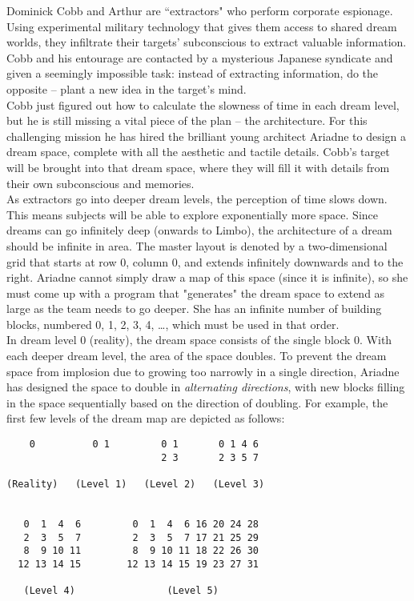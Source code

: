 
\noindent Dominick Cobb and Arthur are ``extractors" who perform corporate espionage. Using experimental military technology that gives them access to shared dream worlds, they infiltrate their targets' subconscious to extract valuable information. Cobb and his entourage are contacted by a mysterious Japanese syndicate and given a seemingly impossible task: instead of extracting information, do the opposite -- plant a new idea in the target's mind.\\

Cobb just figured out how to calculate the slowness of time in each dream level, but he is still missing a vital piece of the plan -- the architecture. For this challenging mission he has hired the brilliant young architect Ariadne to design a dream space, complete with all the aesthetic and tactile details. Cobb's target will be brought into that dream space, where they will fill it with details from their own subconscious and memories.\\

As extractors go into deeper dream levels, the perception of time slows down. This means subjects will be able to explore exponentially more space. Since dreams can go infinitely deep (onwards to Limbo), the architecture of a dream should be infinite in area. The master layout is denoted by a two-dimensional grid that starts at row 0, column 0, and extends infinitely downwards and to the right. Ariadne cannot simply draw a map of this space (since it is infinite), so she must come up with a program that "generates" the dream space to extend as large as the team needs to go deeper. She has an infinite number of building blocks, numbered 0, 1, 2, 3, 4, \dots, which must be used in that order.\\

In dream level 0 (reality), the dream space consists of the single block 0. With each deeper dream level, the area of the space doubles. To prevent the dream space from implosion due to growing too narrowly in a single direction, Ariadne has designed the space to double in \textit{alternating directions}, with new blocks filling in the space sequentially based on the direction of doubling. For example, the first few levels of the dream map are depicted as follows:\\

\begin{center}
\begin{minipage}{8cm}
\begin{verbatim}
    0          0 1         0 1       0 1 4 6
                           2 3       2 3 5 7

(Reality)   (Level 1)   (Level 2)   (Level 3)


   0  1  4  6         0  1  4  6 16 20 24 28
   2  3  5  7         2  3  5  7 17 21 25 29
   8  9 10 11         8  9 10 11 18 22 26 30
  12 13 14 15        12 13 14 15 19 23 27 31

   (Level 4)                (Level 5)

\end{verbatim}
\end{minipage}
\end{center}

